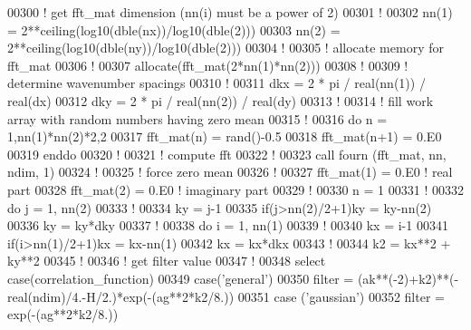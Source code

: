 \begin{DoxyCode}
00300     \textcolor{comment}{! get fft\_mat dimension (nn(i) must be a power of 2)}
00301     \textcolor{comment}{!}
00302     nn(1) = 2**ceiling(log10(dble(nx))/log10(dble(2)))
00303     nn(2) = 2**ceiling(log10(dble(ny))/log10(dble(2)))
00304     \textcolor{comment}{!}
00305     \textcolor{comment}{! allocate memory for fft\_mat}
00306     \textcolor{comment}{!}
00307     \textcolor{keyword}{allocate}(fft\_mat(2*nn(1)*nn(2)))
00308     \textcolor{comment}{!}
00309     \textcolor{comment}{! determine wavenumber spacings}
00310     \textcolor{comment}{!}
00311     dkx = 2 * pi / \textcolor{keywordtype}{real(nn(1))} / \textcolor{keywordtype}{real}(dx)
00312     dky = 2 * pi / \textcolor{keywordtype}{real(nn(2))} / \textcolor{keywordtype}{real}(dy)
00313     \textcolor{comment}{!}
00314     \textcolor{comment}{! fill work array with random numbers having zero mean}
00315     \textcolor{comment}{!}
00316     \textcolor{keyword}{do} n = 1,nn(1)*nn(2)*2,2
00317        fft\_mat(n) = rand()-0.5
00318        fft\_mat(n+1) = 0.E0
00319     \textcolor{keyword}{enddo}
00320     \textcolor{comment}{!}
00321     \textcolor{comment}{! compute fft}
00322     \textcolor{comment}{!}
00323     call fourn (fft\_mat, nn, ndim, 1)
00324     \textcolor{comment}{!}
00325     \textcolor{comment}{! force zero mean}
00326     \textcolor{comment}{!}
00327     fft\_mat(1) = 0.E0 \textcolor{comment}{! real part}
00328     fft\_mat(2) = 0.E0 \textcolor{comment}{! imaginary part}
00329     \textcolor{comment}{!}
00330     n = 1
00331     \textcolor{comment}{!}
00332     \textcolor{keyword}{do} j = 1, nn(2)
00333        \textcolor{comment}{!}
00334        ky = j-1
00335        \textcolor{keyword}{if}(j>nn(2)/2+1)ky = ky-nn(2)
00336        ky = ky*dky
00337        \textcolor{comment}{!}
00338        \textcolor{keyword}{do} i = 1, nn(1)
00339           \textcolor{comment}{!}
00340           kx = i-1
00341           \textcolor{keyword}{if}(i>nn(1)/2+1)kx = kx-nn(1)
00342           kx = kx*dkx
00343           \textcolor{comment}{!}
00344           k2 = kx**2 + ky**2
00345           \textcolor{comment}{!}
00346           \textcolor{comment}{! get filter value}
00347           \textcolor{comment}{!}
00348           \textcolor{keyword}{select} \textcolor{keyword}{case}(correlation\_function)
00349           \textcolor{keyword}{case}(\textcolor{stringliteral}{'general'}) 
00350              filter = (ak**(-2)+k2)**(-\textcolor{keywordtype}{real}(ndim)/4.-H/2.)*exp(-(ag**2*k2/8.))
00351           \textcolor{keyword}{case} (\textcolor{stringliteral}{'gaussian'}) 
00352              filter = exp(-(ag**2*k2/8.))

\end{DoxyCode}

